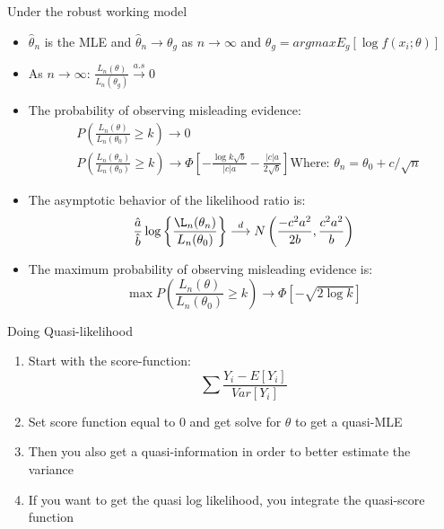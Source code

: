 \documentclass[avery5388,grid,frame]{flashcards}
\begin{document}
\begin{flashcard}{Under the robust working model}
\footnotesize{\begin{itemize}
\item $\hat{\theta}_n$ is the MLE and $\hat{\theta}_n\rightarrow \theta_g$ as $n\rightarrow \infty$ and $\theta_g=argmaxE_g[\log f(x_i;\theta)]$
\item As $n\rightarrow\infty$: 
$\frac{L_n(\theta)}{L_n(\theta_g)}\overset{a.s}{\longrightarrow}0$
\item The probability of observing misleading evidence:
\begin{align*}
&P\left(\frac{L_n(\theta)}{L_n(\theta_0)}\geq k\right)\rightarrow 0\\
&P\left(\frac{L_n(\theta_n)}{L_n(\theta_0)}\geq k\right)\rightarrow \Phi\left[-\frac{\log k\sqrt{b}}{|c|a}-\frac{|c|a}{2\sqrt{b}}\right]
\textrm{Where: }\theta_n=\theta_0+c/\sqrt{n}
\end{align*}
\item The asymptotic behavior of the likelihood ratio is:
\begin{equation*}
\frac{\hat{a}}{\hat{b}}\log\left\{\frac{\L_n(\theta_n)}{L_n(\theta_0)}\right\}\overset{d}{\longrightarrow}N\left(\frac{-c^2a^2}{2b},\frac{c^2a^2}{b}\right)
\end{equation*}
\item The maximum probability of observing misleading evidence is:
\begin{equation*}
\max P\left(\frac{L_n(\theta)}{L_n(\theta_0)}\geq k\right)\rightarrow \Phi\left[-\sqrt{2\log k}\right]
\end{equation*}
\end{itemize}}
\end{flashcard}
\begin{flashcard}{Doing Quasi-likelihood}
\bigskip
\begin{enumerate}
\item Start with the score-function:
\begin{equation*}
\sum\frac{Y_i-E[Y_i]}{Var[Y_i]}
\end{equation*}
\item Set score function equal to 0 and get solve for $\theta$ to get a quasi-MLE
\item Then you also get a quasi-information in order to better estimate the variance
\item If you want to get the quasi log likelihood, you integrate the quasi-score function
\end{enumerate}
\end{flashcard}
\end{document}
